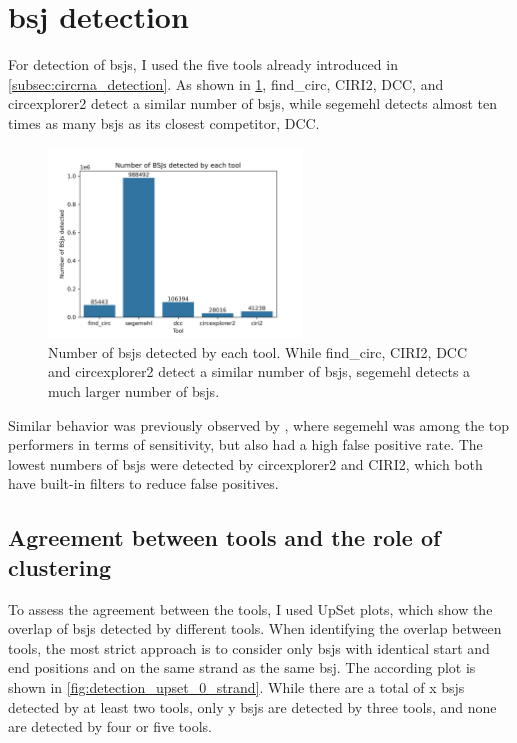 \section{\Acrfull{bsj} detection}

For detection of \gls{bsj}s, I used the five tools already introduced in
\cref{subsec:circrna_detection}.
As shown in \cref{fig:detection_bars}, find\_circ, CIRI2, DCC, and
circexplorer2 detect a similar number of \gls{bsj}s, while segemehl detects
almost ten times as many \gls{bsj}s as its closest competitor, DCC.

\begin{figure}[ht] \centering

    \includegraphics[width=0.6\textwidth]{chapters/4_results_and_discussion/figures/detection/n_bsjs_detected.png}
    \caption{Number of \gls{bsj}s detected by each tool.
        While find\_circ, CIRI2, DCC and circexplorer2 detect a similar number of
        \gls{bsj}s, segemehl detects a much larger number of \gls{bsj}s.
    }
    \label{fig:detection_bars}
\end{figure}
Similar behavior was previously observed by \textcite{zeng_comprehensive_2017},
where segemehl was among the top performers in terms of sensitivity, but also
had a high false positive rate.
The lowest numbers of \gls{bsj}s were detected by circexplorer2 and CIRI2,
which both have built-in filters to reduce false
positives\supercite{zhang_diverse_2016,gao_circular_2018}.

\subsection{Agreement between tools and the role of clustering}

To assess the agreement between the tools, I used UpSet plots, which show the
overlap of \gls{bsj}s detected by different tools.
When identifying the overlap between tools, the most strict approach is to
consider only \gls{bsj}s with identical start and end positions and on the same
strand as the same \gls{bsj}.
The according plot is shown in \cref{fig:detection_upset_0_strand}.
While there are a total of x \gls{bsj}s detected by at least two tools, only y
\gls{bsj}s are detected by three tools, and none are detected by four or five
tools.

